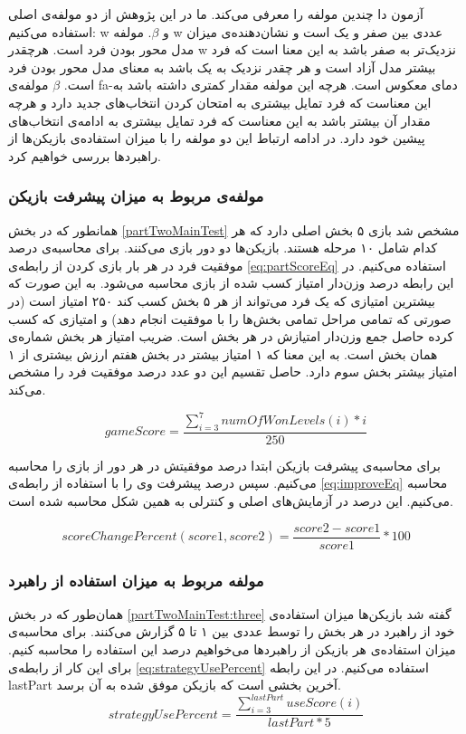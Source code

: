 \documentclass[twoside, a4paper,11pt]{book}
\numberwithin{equation}{chapter}
\numberwithin{table}{chapter}
\numberwithin{figure}{chapter}
\numberwithin{equation}{chapter}
\newcommand{\mls}[1]{\gls{fa-#1}\glsuseri{la-#1}}
\begin{document}
آزمون دا چندین مولفه را معرفی می‌کند. ما در این پژوهش از دو مولفه‌ی اصلی استفاده می‌کنیم: w و $\beta$. مولفه w عددی بین صفر و یک است و نشان‌دهنده‌ی میزان مدل محور بودن فرد است. هرچقدر w نزدیک‌تر به صفر باشد به این معنا است که فرد بیشتر مدل آزاد است و هر چقدر نزدیک به یک باشد به معنای مدل محور بودن فرد است. $\beta$ مولفه‌ی \mls{دمای معکوس} است. هرچه این مولفه مقدار کمتری داشته باشد به این معناست که فرد تمایل بیشتری به امتحان کردن انتخاب‌های جدید دارد و هرچه مقدار آن بیشتر باشد به این معناست که فرد تمایل بیشتری به ادامه‌ی انتخاب‌های پیشین خود دارد. در ادامه ارتباط این دو مولفه را با میزان استفاده‌ی بازیکن‌ها از راهبردها بررسی خواهیم کرد. 
\subsubsection{مولفه‌ی مربوط به میزان پیشرفت بازیکن}
همانطور که در بخش \ref{partTwoMainTest} مشخص شد بازی ۵ بخش اصلی دارد که هر کدام شامل ۱۰ مرحله هستند. بازیکن‌ها دو دور بازی می‌کنند. برای محاسبه‌ی درصد موفقیت فرد در هر بار بازی کردن از رابطه‌ی \ref{eq:partScoreEq} استفاده می‌کنیم. در این رابطه درصد وزن‌دار امتیاز کسب شده از بازی محاسبه می‌شود. به این صورت که بیشترین امتیازی که یک فرد می‌تواند از هر ۵ بخش کسب کند ۲۵۰ امتیاز است (در صورتی که تمامی مراحل تمامی بخش‌ها را با موفقیت انجام دهد) و امتیازی که کسب کرده حاصل جمع وزن‌دار امتیازش در هر بخش است. ضریب امتیاز هر بخش شماره‌ی همان بخش است. به این معنا که ۱ امتیاز بیشتر در بخش هفتم ارزش بیشتری از ۱ امتیاز بیشتر بخش سوم دارد. حاصل تقسیم این دو عدد درصد موفقیت فرد را مشخص می‌کند.

\begin{equation}
\label{eq:partScoreEq}
	gameScore = \frac{\sum_{i=3}^{7} numOfWonLevels(i)*i }{250}
\end{equation}

برای محاسبه‌ی پیشرفت بازیکن ابتدا درصد موفقیتش در هر دور از بازی را محاسبه می‌کنیم. سپس درصد پیشرفت وی را با استفاده از رابطه‌ی \ref{eq:improveEq} محاسبه می‌کنیم. این درصد در آزمایش‌های اصلی و کنترلی به همین شکل محاسبه شده است.

\begin{equation}
\label{eq:improveEq}
	scoreChangePercent(score1, score2) = \frac{score2 - score1}{score1}*100
\end{equation}

\subsubsection{مولفه مربوط به میزان استفاده از راهبرد}

همان‌طور که در بخش \ref{partTwoMainTest:three} گفته شد بازیکن‌ها میزان استفاده‌ی خود از راهبرد در هر بخش را توسط عددی بین ۱ تا ۵ گزارش می‌کنند. برای محاسبه‌ی میزان استفاده‌ی هر بازیکن از راهبردها می‌خواهیم درصد این استفاده را محاسبه کنیم. برای این کار از رابطه‌ی \ref{eq:strategyUsePercent} استفاده می‌کنیم. در این رابطه lastPart آخرین بخشی است که بازیکن موفق شده به آن برسد.
\begin{equation}
\label{eq:strategyUsePercent}
strategyUsePercent = \frac{\sum_{i=3}^{lastPart} useScore(i)}{lastPart*5}
\end{equation}
\end{document}
